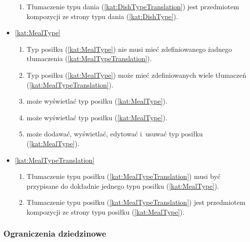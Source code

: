\begin{itemize}[label={\textbf{Reguły dla}}, wide, labelwidth=!, labelindent=0pt]
\begin{enumerate}[label={\textbf{REG/3/\protect\twodigits{\arabic{enumi}}}}, wide, labelwidth=!, align=left, leftmargin=3cm, resume]
        \item Tłumaczenie typu dania (\ref{kat:DishTypeTranslation}) jest przedmiotem kompozycji ze strony typu dania (\ref{kat:DishType}).
    \end{enumerate}
    \item\ref{kat:MealType}\mynobreakpar
    \begin{enumerate}[label={\textbf{REG/3/\protect\twodigits{\arabic{enumi}}}}, wide, labelwidth=!, align=left, leftmargin=3cm, resume]
        \item Typ posiłku (\ref{kat:MealType}) nie musi mieć zdefiniowanego żadnego tłumaczenia (\ref{kat:MealTypeTranslation}).
        \item Typ posiłku (\ref{kat:MealType}) może mieć zdefiniowanych wiele tłumaczeń (\ref{kat:MealTypeTranslation}).
        \item {} może wyświetlać typ posiłku (\ref{kat:MealType}).
        \item {} może wyświetlać typ posiłku (\ref{kat:MealType}).
        \item {} może dodawać, wyświetlać, edytować i~usuwać typ posiłku (\ref{kat:MealType}).
    \end{enumerate}
    \item\ref{kat:MealTypeTranslation}\mynobreakpar
    \begin{enumerate}[label={\textbf{REG/3/\protect\twodigits{\arabic{enumi}}}}, wide, labelwidth=!, align=left, leftmargin=3cm, resume]
        \item Tłumaczenie typu posiłku (\ref{kat:MealTypeTranslation}) musi być przypisane do dokładnie jednego typu posiłku (\ref{kat:MealType}).
        \item Tłumaczenie typu posiłku (\ref{kat:MealTypeTranslation}) jest przedmiotem kompozycji ze strony typu posiłku (\ref{kat:MealType}).
    \end{enumerate}
\end{itemize}

\subsubsection{Ograniczenia dziedzinowe}\label{subsubsec:database:recipes:restrictions}

